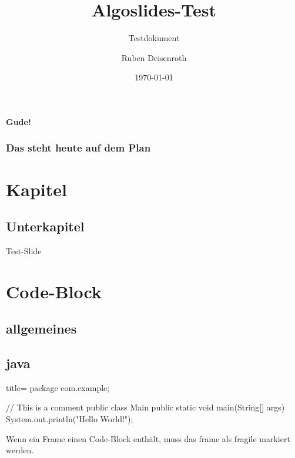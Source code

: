 \documentclass[
    ngerman,
    accentcolor=3b,
    dark_mode,
    fontsize=12pt,
    a4paper,
    aspectratio=169,
    colorback=true,
    fancy_row_colors,
    leqno,
    fleqn,
    boxarc,
    fleqn,
]{algoslides}
\title{Algoslides-Test}
\subtitle{Testdokument}
\author{Ruben Deisenroth}
\date{\today}
\begin{document}

    \maketitle{}

    \begin{frame}[c]
        \centering\huge\textbf{Gude!}
    \end{frame}

    \begin{frame}
        \frametitle{Das steht heute auf dem Plan}
        \tableofcontents[subsubsectionstyle=hide]
    \end{frame}


    \section{Kapitel}
    \subsection{Unterkapitel}

    \begin{frame}
        \slidehead{}
        Test-Slide
    \end{frame}

    \section{Code-Block} \subsection{allgemeines} \subsection{java}

    \begin{frame}[fragile,c]
        \slidehead{}
        \begin{codeBlock}[]{title=}
        package com.example;

        // This is a comment
        public class Main {
            public static void main(String[] args) {
                System.out.println("Hello World!");
            }
        }
    \end{codeBlock}
        \begin{defBox}
            Wenn ein Frame einen Code-Block enthält, muss das frame als fragile markiert werden.
        \end{defBox}
    \end{frame}
\end{document}
